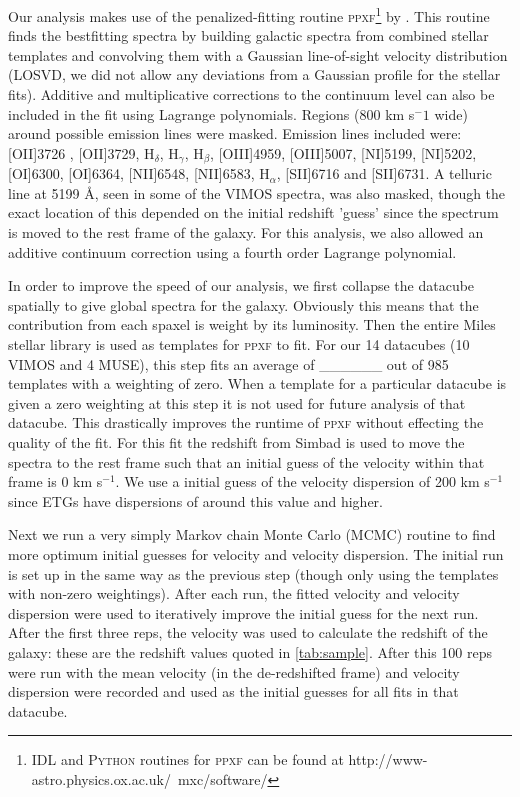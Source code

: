 		Our analysis makes use of the penalized-fitting routine \textsc{ppxf}\footnote{\textsc{IDL} and \textsc{Python} routines for \textsc{ppxf} can be found at http://www-astro.physics.ox.ac.uk/~mxc/software/} by \citet{Cappellari2004, Cappellari2016a}. This routine finds the bestfitting spectra by building galactic spectra from combined stellar templates and convolving them with a Gaussian line-of-sight velocity distribution (LOSVD, we did not allow any deviations from a Gaussian profile for the stellar fits). Additive and multiplicative corrections to the continuum level can also be included in the fit using Lagrange polynomials. Regions (800 km s$^-1$ wide) around possible emission lines were masked. Emission lines included were: [OII]3726 , [OII]3729, H$_\delta$, H$_\gamma$, H$_\beta$, [OIII]4959, [OIII]5007, [NI]5199, [NI]5202, [OI]6300, [OI]6364, [NII]6548, [NII]6583, H$_\alpha$, [SII]6716 and [SII]6731. A telluric line at 5199 \AA, seen in some of the VIMOS spectra, was also masked, though the exact location of this depended on the initial redshift 'guess' since the spectrum is moved to the rest frame of the galaxy. For this analysis, we also allowed an additive continuum correction using a fourth order Lagrange polynomial.

		In order to improve the speed of our analysis, we first collapse the datacube spatially to give global spectra for the galaxy. Obviously this means that the contribution from each spaxel is weight by its luminosity. Then the entire Miles stellar library \citep{} is used as templates for \textsc{ppxf} to fit. For our 14 datacubes (10 VIMOS and 4 MUSE), this step fits an average of \_\_\_\_\_\_ out of 985 templates with a weighting of zero. When a template for a particular datacube is given a zero weighting at this step it is not used for future analysis of that datacube. This drastically improves the runtime of \textsc{ppxf} without effecting the quality of the fit. For this fit the redshift from Simbad is used to move the spectra to the rest frame such that an initial guess of the velocity within that frame is 0 km s$^{-1}$. We use a initial guess of the velocity dispersion of 200 km s$^{-1}$ since ETGs have dispersions of around this value and higher. 

		Next we run a very simply Markov chain Monte Carlo (MCMC) routine to find more optimum initial guesses for velocity and velocity dispersion. The initial run is set up in the same way as the previous step (though only using the templates with non-zero weightings). After each run, the fitted velocity and velocity dispersion were used to iteratively improve the initial guess for the next run. After the first three reps, the velocity was used to calculate the redshift of the galaxy: these are the redshift values quoted in \ref{tab:sample}. After this 100 reps were run with the mean velocity (in the de-redshifted frame) and velocity dispersion were recorded and used as the initial guesses for all fits in that datacube. 

